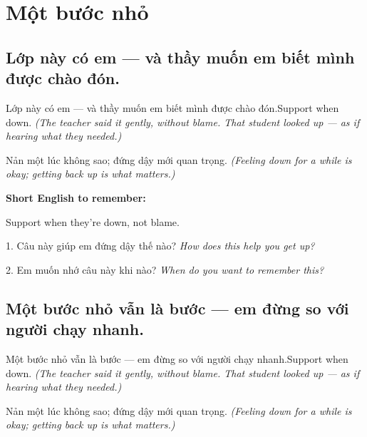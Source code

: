\chapter{Một bước nhỏ}


\section{Lớp này có em — và thầy muốn em biết mình được chào đón.}
\begin{truyen}{Lớp này có em — và thầy muốn em biết mình được chào đón.}{Support when down.}
\textit{(The teacher said it gently, without blame. That student looked up — as if hearing what they needed.)}
\end{truyen}

\begin{baihoc}
Nản một lúc không sao; đứng dậy mới quan trọng.
\textit{(Feeling down for a while is okay; getting back up is what matters.)}
\end{baihoc}

\begin{ghinhoanh}
\textbf{Short English to remember:}

Support when they're down, not blame.

\end{ghinhoanh}

\begin{tuhocnhanh}
1. Câu này giúp em đứng dậy thế nào? \textit{How does this help you get up?}

2. Em muốn nhớ câu này khi nào? \textit{When do you want to remember this?}
\end{tuhocnhanh}
\ngancach


\section{Một bước nhỏ vẫn là bước — em đừng so với người chạy nhanh.}
\begin{truyen}{Một bước nhỏ vẫn là bước — em đừng so với người chạy nhanh.}{Support when down.}
\textit{(The teacher said it gently, without blame. That student looked up — as if hearing what they needed.)}
\end{truyen}

\begin{baihoc}
Nản một lúc không sao; đứng dậy mới quan trọng.
\textit{(Feeling down for a while is okay; getting back up is what matters.)}
\end{baihoc}

